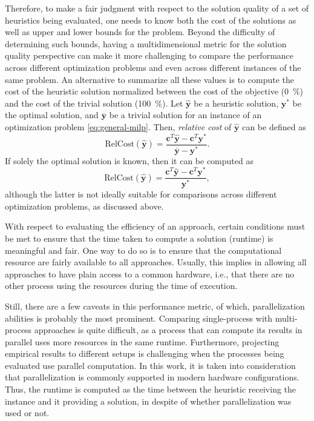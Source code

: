 Therefore, to make a fair judgment with respect to the solution quality of a set of heuristics being evaluated, one needs to know both the cost of the solutions as well as upper and lower bounds for the problem.
Beyond the difficulty of determining such bounds, having a multidimensional metric for the solution quality perspective can make it more challenging to compare the performance across different optimization problems and even across different instances of the same problem.
An alternative to summarize all these values is to compute the cost of the heuristic solution normalized between the cost of the objective (0~\%) and the cost of the trivial solution (100~\%).
Let $\hat{\bm{y}}$ be a heuristic solution, $\bm{y}^*$ be the optimal solution, and $\overline{\bm{y}}$ be a trivial solution for an instance of an optimization problem \eqref{eq:general-milp}.
Then, \emph{relative cost} of $\hat{\bm{y}}$ can be defined as
\begin{equation}
    \text{RelCost}(\hat{\bm{y}}) = \frac{\bm{c}^{T} \hat{\bm{y}} - \bm{c}^{T} \bm{y}^*}{\overline{\bm{y}} - \bm{y}^*}
.\end{equation}
If solely the optimal solution is known, then it can be computed as
\begin{equation}
    \text{RelCost}(\hat{\bm{y}}) = \frac{\bm{c}^{T} \hat{\bm{y}} - \bm{c}^{T} \bm{y}^*}{\bm{y}^*}
,\end{equation}
although the latter is not ideally suitable for comparisons across different optimization problems, as discussed above.

With respect to evaluating the efficiency of an approach, certain conditions must be met to ensure that the time taken to compute a solution (runtime) is meaningful and fair.
One way to do so is to ensure that the computational resource are fairly available to all approaches.
Usually, this implies in allowing all approaches to have plain access to a common hardware, i.e., that there are no other process using the resources during the time of execution.

Still, there are a few caveats in this performance metric, of which, parallelization abilities is probably the most prominent.
Comparing single-process with multi-process approaches is quite difficult, as a process that can compute its results in parallel uses more resources in the same runtime. 
Furthermore, projecting empirical results to different setups is challenging when the processes being evaluated use parallel computation. 
In this work, it is taken into consideration that parallelization is commonly supported in modern hardware configurations.
Thus, the runtime is computed as the time between the heuristic receiving the instance and it providing a solution, in despite of whether parallelization was used or not.

